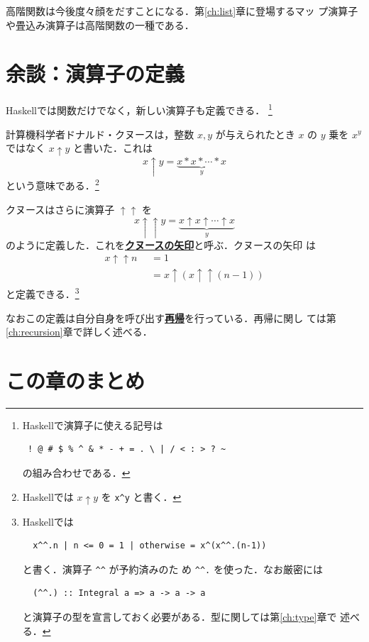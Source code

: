\documentclass[a5paper,twoside,fleqn]{jsbook}
\newcommand{\programminglanguage}[1]{\textsf{#1}}
\newcommand{\haskell}{\programminglanguage{Haskell}}
\newcommand{\keyword}[1]{{\underline{\textbf{#1}}}}
\newcommand{\code}[1]{\texttt{#1}}
\newcommand{\mKeyword}[1]{\mathsf{#1}} %
\newcommand{\mOtherwiseKeyword}{\mKeyword{otherwise}}
\DeclareMathOperator{\mOtherwise}{\mOtherwiseKeyword}
\newcommand{\mGuard}[1]{\mathop{\mid_{#1}}}
\begin{document}
高階関数は今後度々顔をだすことになる．第\ref{ch:list}章に登場するマッ
プ演算子や畳込み演算子は高階関数の一種である．

\section{余談：演算子の定義}

\haskell では関数だけでなく，新しい演算子も定義できる．
\footnote{\haskell で演算子に使える記号は
\begin{verbatim}
 ! @ # $ % ^ & * - + = . \ | / < : > ? ~
\end{verbatim}%
の組み合わせである．}


計算機科学者ドナルド・クヌースは，整数 $x,y$ が与えられたとき $x$ の
$y$ 乗を $x^y$ ではなく $x\uparrow y$ と書いた．これは
\begin{equation}
x\uparrow y=\underbrace{x*x*\dotsb*x}_{y}
\end{equation}
という意味である．\footnote{\haskell では $x\uparrow y$ を
  \code{x\textasciicircum y} と書く．}

クヌースはさらに演算子 $\uparrow\uparrow$ を
\begin{equation}
  x\uparrow\uparrow y =\underbrace{x\uparrow x\uparrow\dotsb\uparrow
  x}_{y}
\end{equation}
のように定義した．これを\keyword{クヌースの矢印}と呼ぶ．クヌースの矢印
は
\begin{align}
x\uparrow\uparrow
n&\mGuard{n\le0}=1\\ &\mGuard{\mOtherwise}=x\uparrow(x\uparrow\uparrow(n-1))
\end{align}
と定義できる．\footnote{\haskell では
\begin{verbatim}
  x^^.n | n <= 0 = 1 | otherwise = x^(x^^.(n-1))
\end{verbatim}
と書く．演算子 \code{\textasciicircum\textasciicircum} が予約済みのた
め \code{\textasciicircum\textasciicircum.} を使った．なお厳密には
\begin{verbatim}
  (^^.) :: Integral a => a -> a -> a
\end{verbatim}
と演算子の型を宣言しておく必要がある．型に関しては第\ref{ch:type}章で
述べる．}

なおこの定義は自分自身を呼び出す\keyword{再帰}を行っている．再帰に関し
ては第\ref{ch:recursion}章で詳しく述べる．

\section{この章のまとめ}
\end{document}
